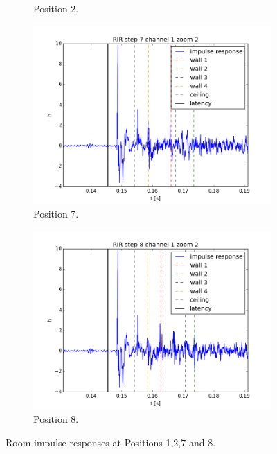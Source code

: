 \begin{figure}
\begin{subfigure}{0.49\linewidth}
        \caption{Position 2.}
        \label{fig:rir_2}
    \end{subfigure}
    \begin{subfigure}{0.49\linewidth}
        \centering
        \includegraphics[width=\linewidth]{files/7_1_filt_zoom2.png}
        \caption{Position 7.}
        \label{fig:rir_7}
    \end{subfigure}
    \begin{subfigure}{0.49\linewidth}
        \centering
        \includegraphics[width=\linewidth]{files/8_1_filt_zoom2.png}
        \caption{Position 8.}
        \label{fig:rir_8}
    \end{subfigure}
    \caption{Room impulse responses at Positions 1,2,7 and 8.}
    \label{fig:rir}
\end{figure}


